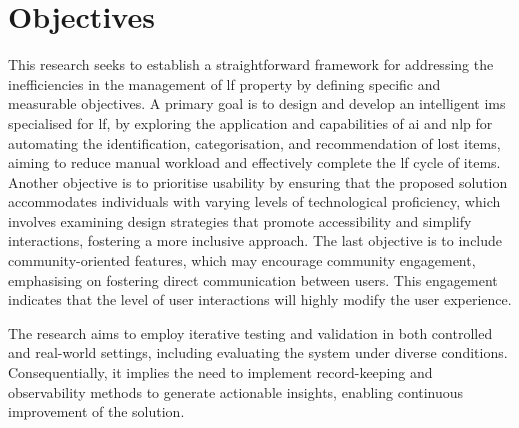 
\section{Objectives} \label{section:objectives}

This research seeks to establish a straightforward framework for addressing the inefficiencies in the management of \ac{lf} property by defining specific and measurable objectives. A primary goal is to design and develop an intelligent \ac{ims} specialised for \ac{lf}, by exploring the application and capabilities of \ac{ai} and \ac{nlp} for automating the identification, categorisation, and recommendation of lost items, aiming to reduce manual workload and effectively complete the \ac{lf} cycle of items. Another objective is to prioritise usability by ensuring that the proposed solution accommodates individuals with varying levels of technological proficiency, which involves examining design strategies that promote accessibility and simplify interactions, fostering a more inclusive approach. The last objective is to include community-oriented features, which may encourage community engagement, emphasising on fostering direct communication between users. This engagement indicates that the level of user interactions will highly modify the user experience.

The research aims to employ iterative testing and validation in both controlled and real-world settings, including evaluating the system under diverse conditions. Consequentially, it implies the need to implement record-keeping and observability methods to generate actionable insights, enabling continuous improvement of the solution.

